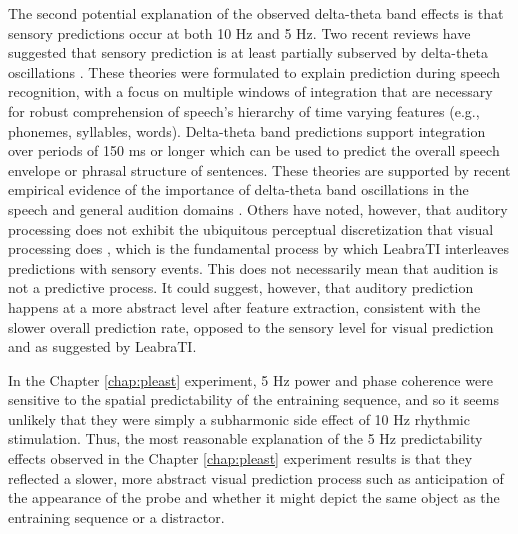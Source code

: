 \documentclass[dwyatte_dissertation.tex]{subfiles}
\begin{document}
The second potential explanation of the observed delta-theta band effects is that sensory predictions occur at both 10 Hz and 5 Hz. Two recent reviews have suggested that sensory prediction is at least partially subserved by delta-theta oscillations \cite{ArnalGiraud12,GiraudPoeppel12}. These theories were formulated to explain prediction during speech recognition, with a focus on multiple windows of integration that are necessary for robust comprehension of speech's hierarchy of time varying features (e.g., phonemes, syllables, words). Delta-theta band predictions support integration over periods of 150 ms or longer which can be used to predict the overall speech envelope \cite{AikenPicton08} or phrasal structure of sentences. These theories are supported by recent empirical evidence of the importance of delta-theta band oscillations in the speech \cite{ArnalWyartGiraud11} and general audition domains . Others have noted, however, that auditory processing does not exhibit the ubiquitous perceptual discretization that visual processing does \cite{VanRullenZoefelIlhan14}, which is the fundamental process by which LeabraTI interleaves predictions with sensory events. This does not necessarily mean that audition is not a predictive process. It could suggest, however, that auditory prediction happens at a more abstract level after feature extraction, consistent with the slower overall prediction rate, opposed to the sensory level for visual prediction and as suggested by LeabraTI. 

In the Chapter \ref{chap:pleast} experiment, 5 Hz power and phase coherence were sensitive to the spatial predictability of the entraining sequence, and so it seems unlikely that they were simply a subharmonic side effect of 10 Hz rhythmic stimulation. Thus, the most reasonable explanation of the 5 Hz predictability effects observed in the Chapter \ref{chap:pleast} experiment results is that they reflected a slower, more abstract visual prediction process such as anticipation of the appearance of the probe and whether it might depict the same object as the entraining sequence or a distractor.
\end{document}
